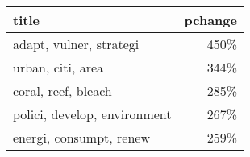 \begin{tabular}{p{1.2cm}r}
\toprule
                        title &  pchange \\
\midrule
      adapt, vulner, strategi &     450\% \\
            urban, citi, area &     344\% \\
          coral, reef, bleach &     285\% \\
 polici, develop, environment &     267\% \\
      energi, consumpt, renew &     259\% \\
\bottomrule
\end{tabular}
